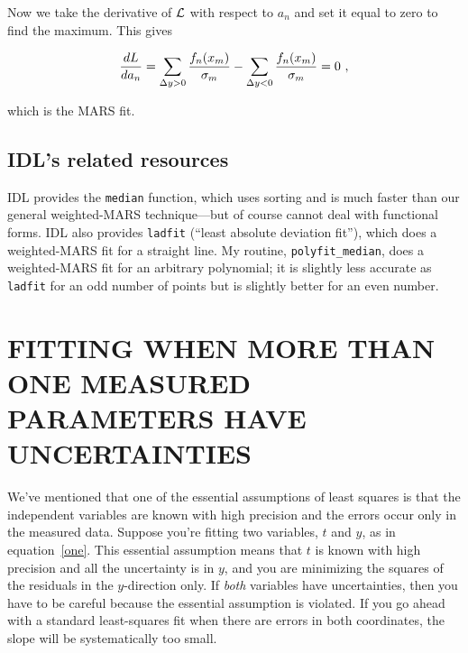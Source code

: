 \documentclass[psfig,preprint]{aastex}
\begin{document}
\noindent Now we take the derivative of $\cal L$ with respect to $a_n$ and
set it equal to zero to find the maximum. This gives

\begin{equation} \label{expmedian}
{ d L \over da_n}= \sum_{\Delta y > 0}  { f_n(x_m) \over \sigma_m}
 - \sum_{\Delta y < 0}  { f_n(x_m) \over \sigma_m}  = 0 \ ,
\end{equation}

\noindent which is the MARS fit.

\subsection{IDL's related resources}

	IDL provides the \verb$median$ function, which uses sorting and
is much faster than our general weighted-MARS technique---but of
course cannot deal with functional forms. IDL also provides
\verb$ladfit$ (``least absolute deviation fit''), which does a
weighted-MARS fit for a straight line. My routine,
\verb$polyfit_median$, does a weighted-MARS fit for an arbitrary
polynomial; it is slightly less accurate as \verb$ladfit$ for an odd
number of points but is slightly better for an even number. 

\newpage

\section{FITTING WHEN MORE THAN ONE MEASURED PARAMETERS HAVE UNCERTAINTIES}
\label{bothsection}

	We've mentioned that one of the essential assumptions of least
squares is that the independent variables are known with high precision
and the errors occur only in the measured data.  Suppose you're fitting
two variables, $t$ and $y$, as in equation~\ref{one}.  This
essential assumption means that $t$ is known with high precision and all
the uncertainty is in $y$, and you are minimizing the squares of
the residuals in the $y$-direction only. If {\it both} variables
have uncertainties, then you have to be careful because the essential
assumption is violated.  If you go ahead with a standard least-squares
fit when there are errors in both coordinates, the slope will be
systematically too small.
\end{document}
